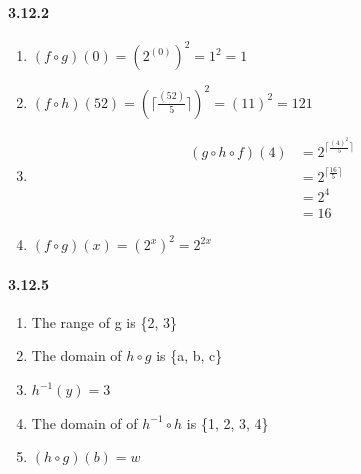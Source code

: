 \documentclass[11pt, letterpaper, twocolumn, fleqn]{article}
\begin{document}
    \paragraph{3.12.2}
    \renewcommand{\labelenumi}{\alph{enumi}.}
    \begin{enumerate}
        \item $(f \circ g)(0)=(2^{(0)})^2=1^2=1$ 
        \item $(f \circ h)(52)=(\lceil \frac{(52)}{5} \rceil)^2 = (11)^2 = 121$
        \item 
            \begin{align*}
                (g \circ h \circ f)(4) &= 2^{\lceil \frac{(4)^2}{5} \rceil} \\
                                       &= 2^{\lceil \frac{16}{5} \rceil} \\
                                       &= 2^{4} \\
                                       &= 16
            \end{align*}
        \addtocounter{enumi}{1}
        \item $(f \circ g)(x)=(2^x)^2 = 2^{2x}$
    \end{enumerate}
    
    \paragraph{3.12.5}
    \renewcommand{\labelenumi}{\alph{enumi}.}
    \begin{enumerate}
        \item The range of g is \{2, 3\}
        \item The domain of $h \circ g$ is \{a, b, c\}
        \item $h^{-1}(y) = 3$
        \item The domain of of $h^{-1} \circ h$ is \{1, 2, 3, 4\}
        \item $(h \circ g)(b)=w$
    \end{enumerate}
\end{document}
